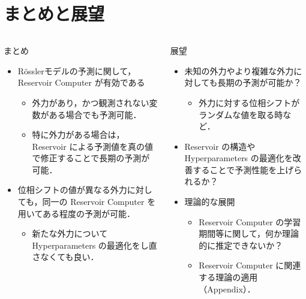 \section{まとめと展望}
\begin{frame}
  \begin{columns}[T] %
    \begin{column}{.5\textwidth}
      まとめ
      \begin{itemize}
        \item Rösslerモデルの予測に関して，Reservoir Computer が有効である\begin{itemize}
          \item 外力があり，かつ観測されない変数がある場合でも予測可能．
          \item 特に外力がある場合は，Reservoir による予測値を真の値で修正することで長期の予測が可能．
        \end{itemize}
        \item 位相シフトの値が異なる外力に対しても，同一の Reservoir Computer を用いてある程度の予測が可能．\begin{itemize}
          \item 新たな外力について Hyperparameters の最適化をし直さなくても良い．
        \end{itemize}
      \end{itemize}
    \end{column}
    \begin{column}{.5\textwidth}
      展望
      \begin{itemize}
          \item 未知の外力やより複雑な外力に対しても長期の予測が可能か？
          \begin{itemize}
            \item 外力に対する位相シフトがランダムな値を取る時など．
          \end{itemize}
        \item Reservoir の構造や Hyperparameters の最適化を改善することで予測性能を上げられるか？
        \item 理論的な展開 \begin{itemize}
          \item Reservoir Computer の学習期間等に関して，何か理論的に推定できないか？
          \item Reservoir Computer に関連する理論の適用（Appendix）．
        \end{itemize}
      \end{itemize}
    \end{column}
  \end{columns}
\end{frame}
